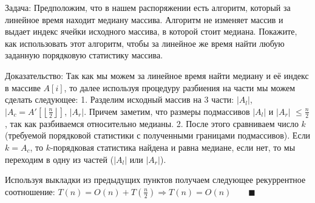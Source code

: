 Задача:
Предположим, что в нашем распоряжении есть алгоритм, который за линейное время находит медиану массива. Алгоритм не
изменяет массив и выдает индекс ячейки исходного массива, в которой стоит медиана. Покажите, как использовать этот алгоритм,
чтобы за линейное же время найти любую заданную порядковую статистику массива.

Доказательство:
Так как мы можем за линейное время найти медиану и её индекс в массиве $A[i]$, то далее используя процедуру разбиения на
части мы можем сделать следующее:
1. Разделим исходный массив на 3 части: $|A_l|$, $|A_c = A'\left[\left\lfloor\frac{n}{2}\right\rfloor\right]$, $|A_r|$.
 Причем заметим, что размеры подмассивов $|A_l|$ и $|A_r|$ $\displaystyle{\leq \frac{n}{2}}$, так как разбиваемся относительно медианы.
2. После этого сравниваем число $k$ (требуемой порядковой статистики с полученными границами подмассивов).
Если $k = A_c$, то $k$-порядковая статистика найдена и равна медиане, если нет, то мы переходим в одну из частей ($|A_l|$
или $|A_r|$).

Используя выкладки из предыдущих пунктов получаем следующее рекуррентное соотношение: $T(n) = O(n) + T(\frac{n}{2}) \Rightarrow
T(n) = O(n) \qquad \blacksquare$